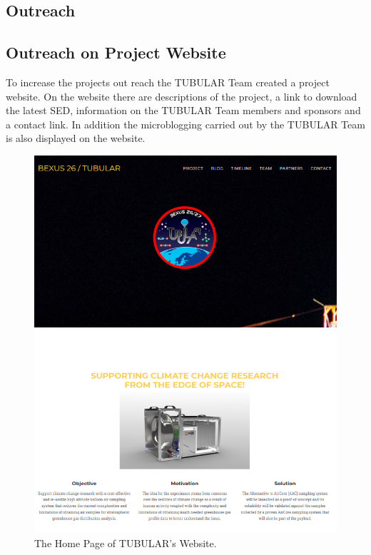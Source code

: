 \documentclass[a4paper,12pt,oneside]{article}
\begin{document}
\begin{appendices}
\section{Outreach} \label{sec:appE}

\subsection{Outreach on Project Website}

To increase the projects out reach the TUBULAR Team created a project website. On the website there are descriptions of the project, a link to download the latest SED, information on the TUBULAR Team members and sponsors and a contact link. In addition the microblogging carried out by the TUBULAR Team is also displayed on the website.

\begin{figure}[H]
    \centering
    \includegraphics[width=0.9\linewidth]{appendix/img/outreach/outreach-tubwebsite-front.PNG}
    \caption{The Home Page of TUBULAR's Website.}
    \label{fig:outreach-tubwebsite}
\end{figure}
\begin{figure}[H]
    \begin{align*}

\end{align*}
\end{figure}
\end{appendices}
\end{document}

